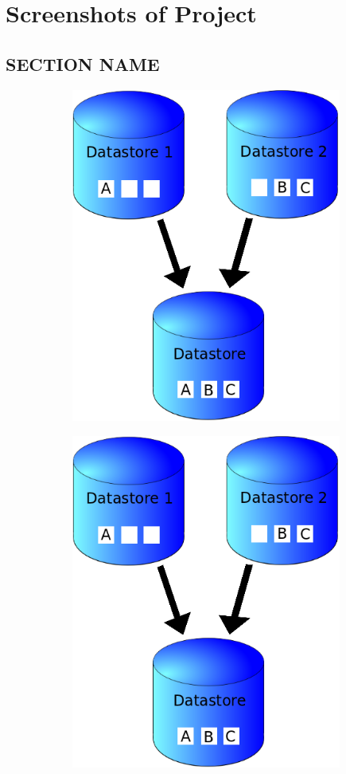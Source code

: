 \chapter{Screenshots of Project}
\section{SECTION NAME}
\vspace{2cm}
\begin{figure}[H]
  \centering
    \includegraphics[height= 11cm, width=17cm]{project/images/data-sync}
\end{figure}
\newpage
\begin{figure}[H]
  \centering
    \includegraphics[height= 11cm, width=17cm]{project/images/data-sync}
\end{figure}
